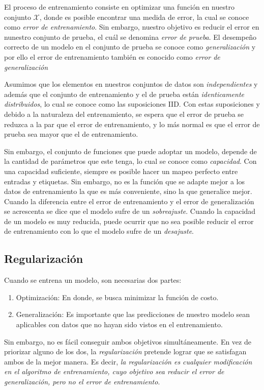     El proceso de entrenamiento consiste en optimizar una función en nuestro conjunto $\mathcal X$, donde es posible encontrar una medida de error, la cual se conoce como \textsl{error de entrenamiento}. Sin embargo, nuestro objetivo es reducir el error en nunestro conjunto de prueba, el cuál se denomina \textsl{error de prueba}. El desempeño correcto de un modelo en el conjunto de prueba se conoce como \textsl{generalización} y por ello el error de entrenamiento también es conocido como \textsl{error de generalización}

    Asumimos que los elementos en nuestros conjuntos de datos son \textsl{independientes} y además que el conjunto de entrenamiento y el de prueba están \textsl{identicamente distribuidos}, lo cual se conoce como las suposiciones IID. Con estas suposiciones y debido a la naturaleza del entrenamiento, se espera que el error de prueba se reduzca a la par que el error de entrenamiento, y lo más normal es que el error de prueba sea mayor que el de entrenamiento.

    Sin embargo, el conjunto de funciones que puede adoptar un modelo, depende de la cantidad de parámetros que este tenga, lo cual se conoce como \textsl{capacidad}. Con una capacidad suficiente, siempre es posible hacer un mapeo perfecto entre entradas y etiquetas. Sin embargo, no es la función que se adapte mejor a los datos de entrenamiento la que es más conveniente, sino la que generalice mejor. Cuando la diferencia entre el error de entrenamiento y el error de generalización se acrescenta se dice que el modelo sufre de un \textsl{sobreajuste}. Cuando la capacidad de un modelo es muy reducida, puede ocurrir que no sea posible reducir el error de entrenamiento con lo que el modelo sufre de un \textsl{desajuste}.

    \subsection{Regularización}
    Cuando se entrena un modelo, son necesarias dos partes: 
    \begin{enumerate}
        \item Optimización: En donde, se busca minimizar la función de costo.
        \item Generalización: Es importante que las predicciones de nuestro modelo sean aplicables con datos que no hayan sido vistos en el entrenamiento.
    \end{enumerate}
    Sin embargo, no es fácil conseguir ambos objetivos simultáneamente. En vez de priorizar alguno de los dos, la \textsl{regularización} pretende lograr que se satisfagan ambos de la mejor manera. Es decir, \textsl{la regularización es cualquier modificación en el algoritmo de entrenamiento, cuyo objetivo sea reducir el error de generalización, pero no el error de entrenamiento}.
        

